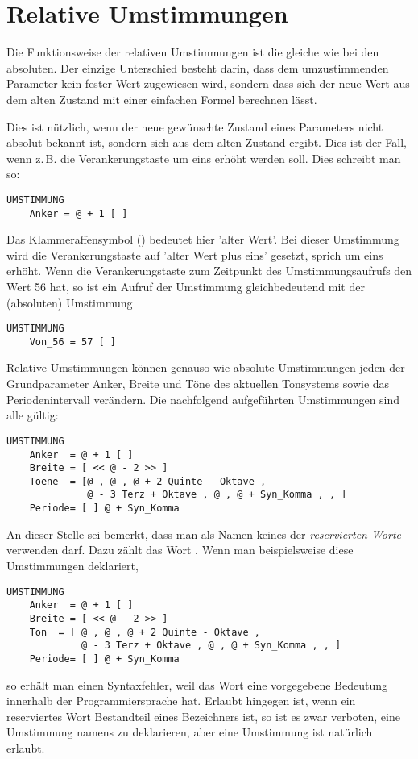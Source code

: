 \section{Relative Umstimmungen}\label{sec:relat-umst}
Die Funktionsweise der relativen Umstimmungen ist die gleiche wie
bei den absoluten. Der einzige Unterschied besteht darin, dass dem
umzustimmenden Parameter kein fester Wert zugewiesen wird, sondern
dass sich der neue Wert aus dem alten Zustand mit einer einfachen Formel
berechnen lässt.

Dies ist nützlich, wenn der neue gewünschte Zustand eines Parameters
nicht absolut bekannt ist, sondern sich aus dem alten Zustand ergibt.
Dies ist der Fall, wenn z.\,B. die Verankerungstaste um eins erhöht
werden soll. Dies schreibt man so:
\begin{verbatim}
UMSTIMMUNG
    Anker = @ + 1 [ ]
\end{verbatim}
Das Klammeraffensymbol () bedeutet hier 'alter Wert'. Bei dieser
Umstimmung wird die Verankerungstaste auf 'alter Wert plus
eins' gesetzt, sprich um eins erhöht.
Wenn die Verankerungstaste zum Zeitpunkt des Umstimmungsaufrufs
den Wert 56 hat, so ist ein Aufruf der Umstimmung 
gleichbedeutend mit der (absoluten) Umstimmung
\begin{verbatim}
UMSTIMMUNG
    Von_56 = 57 [ ]
\end{verbatim}
Relative Umstimmungen können genauso wie absolute Umstimmungen jeden
der Grundparameter Anker, Breite und Töne des aktuellen Tonsystems
sowie das Periodenintervall verändern. Die nachfolgend aufgeführten
Umstimmungen sind alle gültig:
\begin{verbatim}
UMSTIMMUNG
    Anker  = @ + 1 [ ]
    Breite = [ << @ - 2 >> ]
    Toene  = [@ , @ , @ + 2 Quinte - Oktave ,
              @ - 3 Terz + Oktave , @ , @ + Syn_Komma , , ]
    Periode= [ ] @ + Syn_Komma
\end{verbatim}
An dieser Stelle sei bemerkt, dass man als Namen keines der {\it
reservierten Worte} verwenden darf. Dazu zählt das Wort .
Wenn man beispielsweise diese Umstimmungen deklariert,
\begin{verbatim}
UMSTIMMUNG
    Anker  = @ + 1 [ ]
    Breite = [ << @ - 2 >> ]
    Ton  = [ @ , @ , @ + 2 Quinte - Oktave ,
             @ - 3 Terz + Oktave , @ , @ + Syn_Komma , , ]
    Periode= [ ] @ + Syn_Komma
\end{verbatim}
so erhält man einen Syntaxfehler, weil das Wort  eine
vorgegebene Bedeutung innerhalb der Programmiersprache hat. Erlaubt
hingegen ist, wenn ein reserviertes Wort Bestandteil eines Bezeichners
ist, so ist es zwar verboten, eine Umstimmung namens  zu
deklarieren, aber eine Umstimmung  ist natürlich
erlaubt.

